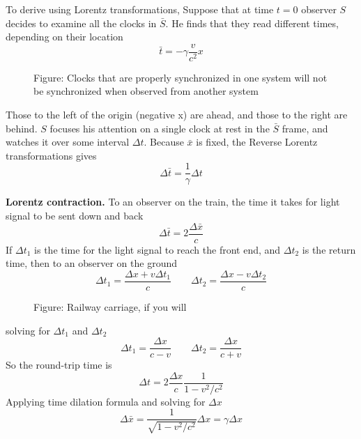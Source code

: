 \documentclass[../../main.tex]{subfiles}
\begin{document}
To derive using Lorentz transformations, Suppose that at time $t = 0$ observer $S$ decides to examine all the clocks in $\bar{S}$. He finds that they read different times, depending on their location
\begin{equation*}
    \bar{t}=-\gamma\frac{v}{c^2}x
\end{equation*}
\begin{figure}
    \centering
    \caption*{Figure: Clocks that are properly synchronized in one system will not be synchronized when observed from another system}
\end{figure}
Those to the left of the origin (negative x) are ahead, and those to the right are behind. $S$ focuses his attention on a single clock at rest in the $\bar{S}$ frame, and watches it over some interval $\Delta t$. Because $\bar{x}$ is fixed, the Reverse Lorentz transformations gives
\begin{equation*}
    \Delta \bar{t}=\frac{1}{\gamma}\Delta t
\end{equation*}

\textbf{Lorentz contraction.} To an observer on the train, the time it takes for light signal to be sent down and back 
\begin{equation*}
    \Delta \bar{t}=2\frac{\Delta \bar{x}}{c}
\end{equation*}
If $\Delta t_1$ is the time for the light signal to reach the front end, and $\Delta t_2$ is the return time, then to an observer on the ground
\begin{equation*}
    \Delta t_1=\frac{\Delta x+v\Delta t_1}{c}\qquad \Delta t_2=\frac{\Delta x-v\Delta t_2}{c}
\end{equation*}
\begin{figure}[b]
    \centering
    \caption*{Figure: Railway carriage, if you will}
\end{figure}
solving for $\Delta t_1$ and $\Delta t_2$
\begin{equation*}
    \Delta t_1=\frac{\Delta x}{c-v}\qquad \Delta t_2=\frac{\Delta x}{c+v}
\end{equation*}
So the round-trip time is
\begin{equation*}
    \Delta t=2\frac{\Delta x}{c}\frac{1}{1-v^2/c^2}
\end{equation*}
Applying time dilation formula and solving for $\Delta x$
\begin{equation*}
    \Delta \bar{x}=\frac{1}{\sqrt{1-v^2/c^2}}\Delta x=\gamma \Delta x
\end{equation*}
\end{document}

